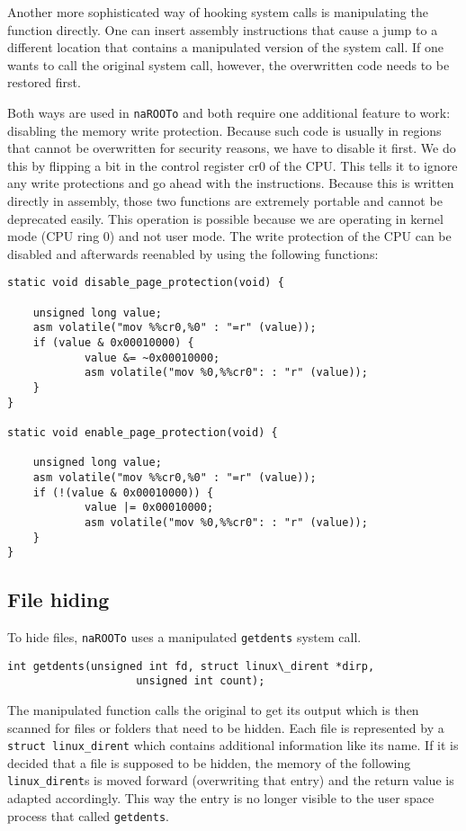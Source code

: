 \documentclass[10pt, letterpaper]{scrartcl}
\begin{document}
Another more sophisticated way of hooking system calls is manipulating the function directly.
One can insert assembly instructions that cause a jump to a different location that contains a manipulated version of the system call.
If one wants to call the original system call, however, the overwritten code needs to be restored first.

Both ways are used in \texttt{naROOTo} and both require one additional feature to work: disabling the memory write protection. 
Because such code is usually in regions that cannot be overwritten for security reasons, we have to disable it first.
We do this by flipping a bit in the control register cr0 of the CPU.
This tells it to ignore any write protections and go ahead with the instructions.
Because this is written directly in assembly, those two functions are extremely portable and cannot be deprecated easily.
This operation is possible because we are operating in kernel mode (CPU ring 0) and not user mode.
The write protection of the CPU can be disabled and afterwards reenabled by using the following functions:

\begin{verbatim}
static void disable_page_protection(void) {

    unsigned long value;
    asm volatile("mov %%cr0,%0" : "=r" (value));
    if (value & 0x00010000) {
            value &= ~0x00010000;
            asm volatile("mov %0,%%cr0": : "r" (value));
    }
}

static void enable_page_protection(void) {

    unsigned long value;
    asm volatile("mov %%cr0,%0" : "=r" (value));
    if (!(value & 0x00010000)) {
            value |= 0x00010000;
            asm volatile("mov %0,%%cr0": : "r" (value));
    }
}
\end{verbatim}

\subsection{File hiding}
To hide files, \texttt{naROOTo} uses a manipulated \texttt{getdents} system call.

\begin{verbatim}
int getdents(unsigned int fd, struct linux\_dirent *dirp,
                    unsigned int count);
\end{verbatim}

The manipulated function calls the original to get its output which is then scanned for files or folders that need to be hidden.
Each file is represented by a \texttt{struct linux\_dirent} which contains additional information like its name.
If it is decided that a file is supposed to be hidden, the memory of the following \texttt{linux\_dirent}s is moved forward (overwriting that entry) and the return value is adapted accordingly.
This way the entry is no longer visible to the user space process that called \texttt{getdents}.
\end{document}
